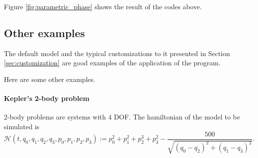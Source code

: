\documentclass[12pt]{article}
\begin{document}
Figure \ref{fig:parametric_phase} shows the result of the codes above.

\subsection{Other examples}

The default model and the typical customizations to it presented in Section \ref{sec:customization}
are good examples of the application of the program.

Here are some other examples.

\paragraph{Kepler's 2-body problem}

2-body problems are systems with $4$ DOF.
The hamiltonian of the model to be simulated is
\begin{equation*}
  \mathcal H\left(t,q_0,q_1,q_2,q_3,p_0,p_1,p_2,p_3\right):=
  p_0^2+p_1^2+p_2^3+p_3^2-\frac{500}{\sqrt{\left(q_0-q_2\right)^2+\left(q_1-q_3\right)^2}}.
\end{equation*}
\end{document}

